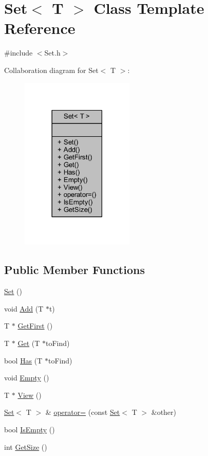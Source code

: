 \hypertarget{class_set}{}\section{Set$<$ T $>$ Class Template Reference}
\label{class_set}


{\ttfamily \#include $<$Set.\+h$>$}



Collaboration diagram for Set$<$ T $>$\+:
\nopagebreak
\begin{figure}[H]
\begin{center}
\leavevmode
\includegraphics[width=153pt]{class_set__coll__graph}
\end{center}
\end{figure}
\subsection*{Public Member Functions}
\begin{DoxyCompactItemize}
\item 
\hyperlink{class_set_ac57fb2ceddf11dad44bcd9329265580d}{Set} ()
\item 
void \hyperlink{class_set_afc630403d8cd371e244ff4c425b40edf}{Add} (T $\ast$t)
\item 
T $\ast$ \hyperlink{class_set_ad9d6a75a557bc4db0578f18675f7517b}{Get\+First} ()
\item 
T $\ast$ \hyperlink{class_set_a6afa992f88acf67a53ae98e7856a9266}{Get} (T $\ast$to\+Find)
\item 
bool \hyperlink{class_set_a48747d0c4789b12fa690fa262e5bf361}{Has} (T $\ast$to\+Find)
\item 
void \hyperlink{class_set_a747da8b4e20a30c1fe7e5e1fd61881aa}{Empty} ()
\item 
T $\ast$ \hyperlink{class_set_af64cceb23979b91751faef3a05c9f698}{View} ()
\item 
\hyperlink{class_set}{Set}$<$ T $>$ \& \hyperlink{class_set_aebe57fae183aa83c69d36d24d26234b1}{operator=} (const \hyperlink{class_set}{Set}$<$ T $>$ \&other)
\item 
bool \hyperlink{class_set_ac0ef2fc243b8e89c6c77485203cde754}{Is\+Empty} ()
\item 
int \hyperlink{class_set_a3638f81fb2a7b08e6f0e2ecd5543f85c}{Get\+Size} ()
\end{DoxyCompactItemize}


